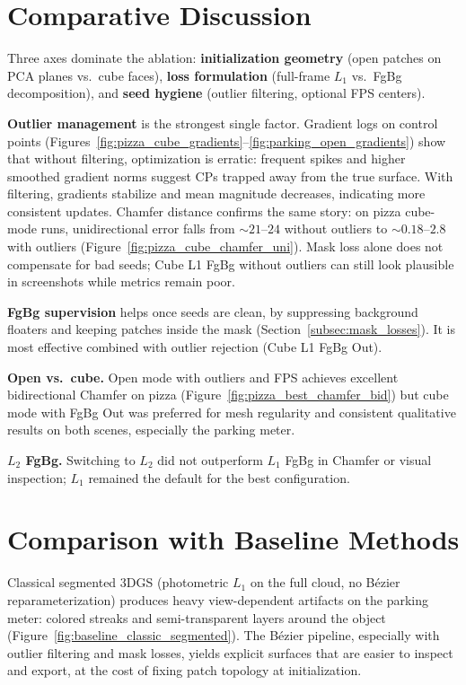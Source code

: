 \section{Comparative Discussion}
\label{sec:results_comparative}

Three axes dominate the ablation: \textbf{initialization geometry} (open patches on PCA planes vs.\ cube faces), \textbf{loss formulation} (full-frame $L_1$ vs.\ FgBg decomposition), and \textbf{seed hygiene} (outlier filtering, optional FPS centers).

\textbf{Outlier management} is the strongest single factor. Gradient logs on control points (Figures~\ref{fig:pizza_cube_gradients}--\ref{fig:parking_open_gradients}) show that without filtering, optimization is erratic: frequent spikes and higher smoothed gradient norms suggest CPs trapped away from the true surface. With filtering, gradients stabilize and mean magnitude decreases, indicating more consistent updates. Chamfer distance confirms the same story: on pizza cube-mode runs, unidirectional error falls from $\sim 21$--$24$ without outliers to $\sim 0.18$--$2.8$ with outliers (Figure~\ref{fig:pizza_cube_chamfer_uni}). Mask loss alone does not compensate for bad seeds; Cube L1 FgBg without outliers can still look plausible in screenshots while metrics remain poor.

\textbf{FgBg supervision} helps once seeds are clean, by suppressing background floaters and keeping patches inside the mask (Section~\ref{subsec:mask_losses}). It is most effective combined with outlier rejection (Cube L1 FgBg Out).

\textbf{Open vs.\ cube.} Open mode with outliers and FPS achieves excellent bidirectional Chamfer on pizza (Figure~\ref{fig:pizza_best_chamfer_bid}) but cube mode with FgBg Out was preferred for mesh regularity and consistent qualitative results on both scenes, especially the parking meter.

\textbf{$L_2$ FgBg.} Switching to $L_2$ did not outperform $L_1$ FgBg in Chamfer or visual inspection; $L_1$ remained the default for the best configuration.

\section{Comparison with Baseline Methods}
\label{sec:results_baseline_compare}

Classical segmented 3DGS (photometric $L_1$ on the full cloud, no B\'ezier reparameterization) produces heavy view-dependent artifacts on the parking meter: colored streaks and semi-transparent layers around the object (Figure~\ref{fig:baseline_classic_segmented}). The B\'ezier pipeline, especially with outlier filtering and mask losses, yields explicit surfaces that are easier to inspect and export, at the cost of fixing patch topology at initialization.

